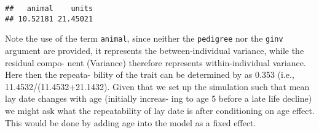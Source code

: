 \documentclass[
  12pt,
]{book}
\newenvironment{Shaded}{\begin{snugshade}}{\end{snugshade}}
\newcommand{\AttributeTok}[1]{\textcolor[rgb]{0.77,0.63,0.00}{#1}}
\newcommand{\ConstantTok}[1]{\textcolor[rgb]{0.00,0.00,0.00}{#1}}
\newcommand{\DecValTok}[1]{\textcolor[rgb]{0.00,0.00,0.81}{#1}}
\newcommand{\FloatTok}[1]{\textcolor[rgb]{0.00,0.00,0.81}{#1}}
\newcommand{\FunctionTok}[1]{\textcolor[rgb]{0.00,0.00,0.00}{#1}}
\newcommand{\NormalTok}[1]{#1}
\newcommand{\OtherTok}[1]{\textcolor[rgb]{0.56,0.35,0.01}{#1}}
\newcommand{\SpecialCharTok}[1]{\textcolor[rgb]{0.00,0.00,0.00}{#1}}
\begin{document}
\begin{Shaded}
\end{Shaded}

\begin{verbatim}
##   animal    units 
## 10.52181 21.45021
\end{verbatim}

Note the use of the term \texttt{animal}, since neither the \texttt{pedigree} nor the \texttt{ginv} argument are provided, it represents the between-individual variance, while the residual compo- nent (Variance) therefore represents within-individual variance. Here then the repeata- bility of the trait can be determined by as 0.353 (i.e., 11.4532/(11.4532+21.1432). Given that we set up the simulation such that mean lay date changes with age (initially increas- ing to age 5 before a late life decline) we might ask what the repeatability of lay date is after conditioning on age effect. This would be done by adding age into the model as a fixed effect.

\begin{Shaded}
\end{Shaded}
\end{document}
